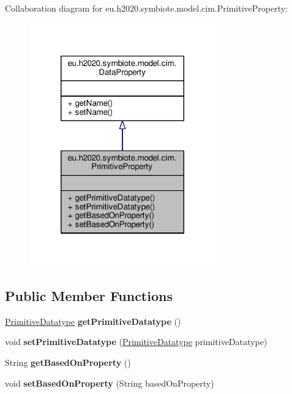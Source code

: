 Collaboration diagram for eu.\+h2020.\+symbiote.\+model.\+cim.\+Primitive\+Property\+:\nopagebreak
\begin{figure}[H]
\begin{center}
\leavevmode
\includegraphics[width=228pt]{classeu_1_1h2020_1_1symbiote_1_1model_1_1cim_1_1PrimitiveProperty__coll__graph}
\end{center}
\end{figure}
\subsection*{Public Member Functions}
\begin{DoxyCompactItemize}
\item 
\mbox{\label{classeu_1_1h2020_1_1symbiote_1_1model_1_1cim_1_1PrimitiveProperty_a755c83883cb280dd6ef435803f6b60af}} 
\hyperlink{classeu_1_1h2020_1_1symbiote_1_1model_1_1cim_1_1PrimitiveDatatype}{Primitive\+Datatype} {\bfseries get\+Primitive\+Datatype} ()
\item 
\mbox{\label{classeu_1_1h2020_1_1symbiote_1_1model_1_1cim_1_1PrimitiveProperty_abdf8eafda5be452a6852d9cf0f80dda1}} 
void {\bfseries set\+Primitive\+Datatype} (\hyperlink{classeu_1_1h2020_1_1symbiote_1_1model_1_1cim_1_1PrimitiveDatatype}{Primitive\+Datatype} primitive\+Datatype)
\item 
\mbox{\label{classeu_1_1h2020_1_1symbiote_1_1model_1_1cim_1_1PrimitiveProperty_a7cd1f927ebe623d4410023d564d28b13}} 
String {\bfseries get\+Based\+On\+Property} ()
\item 
\mbox{\label{classeu_1_1h2020_1_1symbiote_1_1model_1_1cim_1_1PrimitiveProperty_ad03a192170684b152e1a75400f7f6541}} 
void {\bfseries set\+Based\+On\+Property} (String based\+On\+Property)
\end{DoxyCompactItemize}


